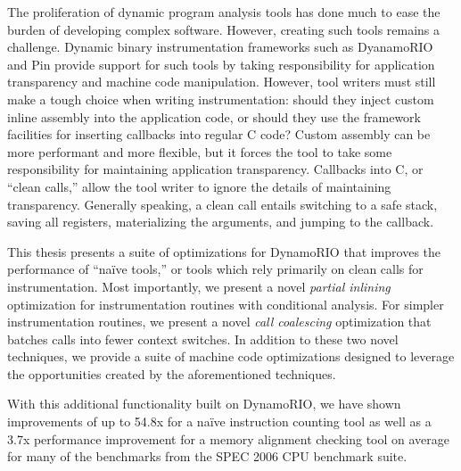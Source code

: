 \begin{abstractpage}

The proliferation of dynamic program analysis tools has done much to ease the
burden of developing complex software.  However, creating such tools remains a
challenge.  Dynamic binary instrumentation frameworks such as DyanamoRIO and
Pin provide support for such tools by taking responsibility for application
transparency and machine code manipulation.  However, tool writers must still
make a tough choice when writing instrumentation: should they inject custom
inline assembly into the application code, or should they use the framework
facilities for inserting callbacks into regular C code?  Custom assembly can be
more performant and more flexible, but it forces the tool to take some
responsibility for maintaining application transparency.  Callbacks into C, or
``clean calls,'' allow the tool writer to ignore the details of maintaining
transparency.  Generally speaking, a clean call entails switching to a safe
stack, saving all registers, materializing the arguments, and jumping to the
callback.

This thesis presents a suite of optimizations for DynamoRIO that improves the
performance of ``na\"ive tools,'' or tools which rely primarily on clean calls
for instrumentation.  Most importantly, we present a novel {\em partial
inlining} optimization for instrumentation routines with conditional analysis.
For simpler instrumentation routines, we present a novel {\em call coalescing}
optimization that batches calls into fewer context switches.  In addition to
these two novel techniques, we provide a suite of machine code optimizations
designed to leverage the opportunities created by the aforementioned techniques.

With this additional functionality built on DynamoRIO, we have shown
improvements of up to 54.8x for a na\"ive instruction counting tool as well as a
3.7x performance improvement for a memory alignment checking tool on average for
many of the benchmarks from the SPEC 2006 CPU benchmark suite.

\end{abstractpage}
